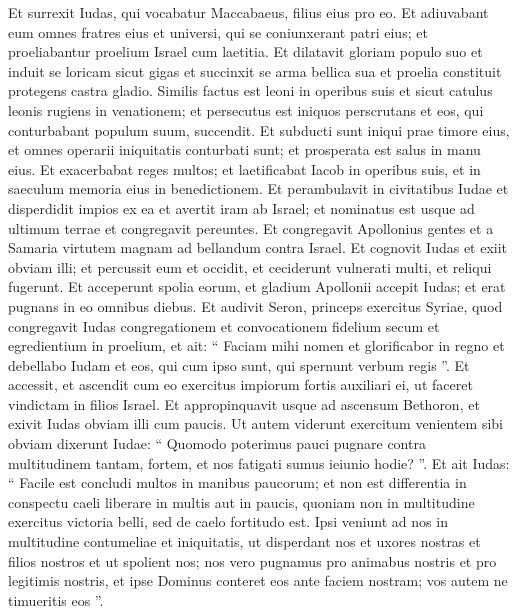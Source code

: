\begin{biblechapter}
\begin{biblechapter}
\begin{biblechapter}
\verse Et surrexit Iudas, qui vocabatur Maccabaeus, filius eius pro eo. 
\verse Et adiuvabant eum omnes fratres eius et universi, qui se coniunxerant patri eius; et proeliabantur proelium Israel cum laetitia. 
\verse Et dilatavit gloriam populo suo et induit se loricam sicut gigas et succinxit se arma bellica sua et proelia constituit protegens castra gladio. 
\verse Similis factus est leoni in operibus suis et sicut catulus leonis rugiens in venationem; 
\verse et persecutus est iniquos perscrutans et eos, qui conturbabant populum suum, succendit. 
\verse Et subducti sunt iniqui prae timore eius, et omnes operarii iniquitatis conturbati sunt; et prosperata est salus in manu eius. 
\verse Et exacerbabat reges multos; et laetificabat Iacob in operibus suis, et in saeculum memoria eius in benedictionem. 
\verse Et perambulavit in civitatibus Iudae et disperdidit impios ex ea et avertit iram ab Israel; 
\verse et nominatus est usque ad ultimum terrae et congregavit pereuntes.
 \verse Et congregavit Apollonius gentes et a Samaria virtutem magnam ad bellandum contra Israel. 
\verse Et cognovit Iudas et exiit obviam illi; et percussit eum et occidit, et ceciderunt vulnerati multi, et reliqui fugerunt. 
\verse Et acceperunt spolia eorum, et gladium Apollonii accepit Iudas; et erat pugnans in eo omnibus diebus. 
\verse Et audivit Seron, princeps exercitus Syriae, quod congregavit Iudas congregationem et convocationem fidelium secum et egredientium in proelium, 
\verse et ait: “ Faciam mihi nomen et glorificabor in regno et debellabo Iudam et eos, qui cum ipso sunt, qui spernunt verbum regis ”. 
\verse Et accessit, et ascendit cum eo exercitus impiorum fortis auxiliari ei, ut faceret vindictam in filios Israel. 
\verse Et appropinquavit usque ad ascensum Bethoron, et exivit Iudas obviam illi cum paucis. 
\verse Ut autem viderunt exercitum venientem sibi obviam dixerunt Iudae: “ Quomodo poterimus pauci pugnare contra multitudinem tantam, fortem, et nos fatigati sumus ieiunio hodie? ”. 
\verse Et ait Iudas: “ Facile est concludi multos in manibus paucorum; et non est differentia in conspectu caeli liberare in multis aut in paucis, 
\verse quoniam non in multitudine exercitus victoria belli, sed de caelo fortitudo est. 
 \verse Ipsi veniunt ad nos in multitudine contumeliae et iniquitatis, ut disperdant nos et uxores nostras et filios nostros et ut spolient nos; 
\verse nos vero pugnamus pro animabus nostris et pro legitimis nostris, 
\verse et ipse Dominus conteret eos ante faciem nostram; vos autem ne timueritis eos ”. 

\end{biblechapter}
\end{biblechapter}
\end{biblechapter}
